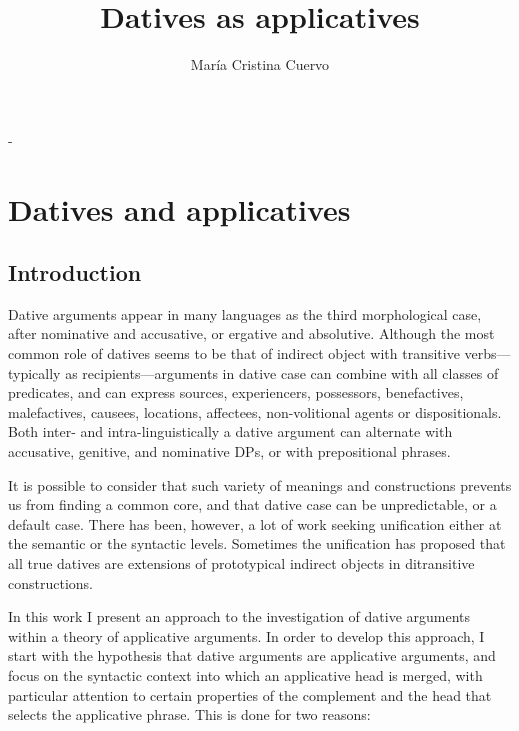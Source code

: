\documentclass[output=paper,colorlinks,citecolor=brown,nonflat]{./langscibook}
\author{María Cristina Cuervo\affiliation{University of Toronto}}
\title{Datives as applicatives}
\begin{document}
\maketitle

-%
\section{Datives and applicatives}\label{sec:cuervo:1}

\subsection{Introduction}\label{sec:cuervo:1.1}

Dative arguments appear in many languages as the third morphological case, after nominative and accusative, or ergative and absolutive. Although the most common role of datives seems to be that of indirect object with transitive verbs—typically as recipients—arguments in dative case can combine with all classes of predicates, and can express sources, experiencers, possessors, benefactives, malefactives, causees, locations, affectees, non-volitional agents or dispositionals. Both inter- and intra-linguistically a dative argument can alternate with accusative, genitive, and nominative DPs, or with prepositional phrases.

It is possible to consider that such variety of meanings and constructions prevents us from finding a common core, and that dative case can be unpredictable, or a default case.  There has been, however, a lot of work seeking unification either at the semantic or the syntactic levels. Sometimes the unification has proposed that all true datives are extensions of prototypical indirect objects in ditransitive constructions.

In this work I present an approach to the investigation of dative arguments within a theory of applicative arguments. In order to develop this approach, I start with the hypothesis that dative arguments are applicative arguments, and focus on the syntactic context into which an applicative head is merged, with particular attention to certain properties of the complement and the head that selects the applicative phrase. This is done for two reasons:
\end{document}
